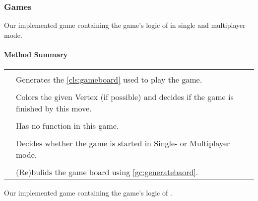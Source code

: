 \pagebreak

\subsubsection{Games}

Our implemented game containing the game's logic of \graphcoloring in single and multiplayer mode. \\

\centerdash

\paragraph*{Method Summary}
\paragraph*{}
\begin{longtable}{Lp{10cm}}
	\startmethodtable
	 \\
	& Generates the \ref{cls:gameboard} used to play the game. \\
	 \\
	& Colors the given Vertex (if possible) and decides if the game is finished by this move. \\
	 \\
	& Has no function in this game. \\
	 \\
	& Decides whether the game is started in Single- or Multiplayer mode. \\
	 \\
	& (Re)bulids the game board using \ref{gc:generatebaord}. \\
	\hline
\end{longtable}

\pagebreak

Our implemented game containing the game's logic of \twixt. \\

